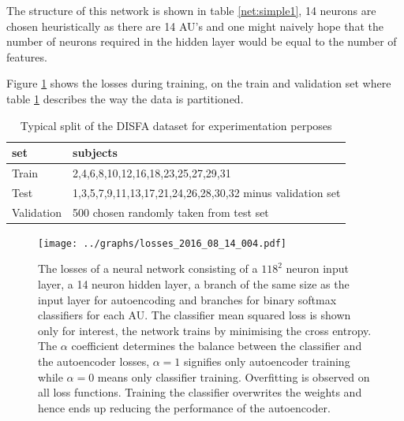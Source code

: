 The structure of this network is shown in table \ref{net:simple1}, 14 neurons
are chosen heuristically as there are 14 AU's and one might naively hope that the number of
neurons required in the hidden layer would be equal to the number of features.

Figure \ref{fig:simple} shows the losses during training, on the train and validation set where table \ref{tab:splitting}
describes the way the data is partitioned.
\begin{table}[h!]
  \centering
  {\footnotesize
  \begin{tabular}{|l|l|}
  \hline
  set & subjects   \\
  \hline
   Train          & 2,4,6,8,10,12,16,18,23,25,27,29,31      \\
  \hline
  Test      & 1,3,5,7,9,11,13,17,21,24,26,28,30,32 minus validation set     \\
  \hline
  Validation           & 500 chosen randomly taken from test set      \\
 \hline
  \end{tabular}
  \caption{Typical split of the DISFA dataset for experimentation perposes}
  \label{tab:splitting}  }
\end{table}


\begin{figure}[!h]
\centering
\texttt{[image: ../graphs/losses\_2016\_08\_14\_004.pdf]}
\caption{The losses of a neural network consisting of a $118^2$ neuron input layer, a 14
neuron hidden layer, a branch of the same size as the input layer for autoencoding
and branches for binary softmax classifiers for each AU. The classifier mean
squared loss is shown only for interest, the network trains by minimising
the cross entropy. The $\alpha$ coefficient determines the balance between the
classifier and the autoencoder losses, $\alpha=1$ signifies only autoencoder training
while $\alpha=0$ means only classifier training. Overfitting is observed
on all loss functions. Training the classifier
overwrites the weights and hence ends up reducing
the performance of the autoencoder.}
\label{fig:simple}
\end{figure}

